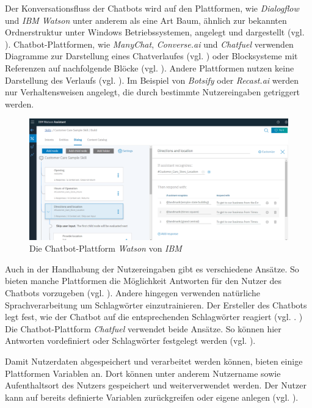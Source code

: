 Der Konversationsfluss der Chatbots wird auf den Plattformen, wie \emph{Dialogflow} und \emph{IBM Watson} unter anderem als eine Art Baum, ähnlich zur bekannten Ordnerstruktur unter Windows Betriebssystemen, angelegt und dargestellt (vgl. \cite{Dialogfl40:online} \cite{KatalogI56:online}). Chatbot-Plattformen, wie \emph{ManyChat}, \emph{Converse.ai} und \emph{Chatfuel} verwenden Diagramme zur Darstellung eines Chatverlaufes (vgl. \cite{Converse15:online} \cite{WelcomeM66:online}) oder Blocksysteme mit Referenzen auf nachfolgende Blöcke (vgl. \cite{Chatfuel3:online}). Andere Plattformen nutzen keine Darstellung des Verlaufs (vgl. \cite{BotsifyC64:online}). Im Beispiel von \emph{Botsify} oder \emph{Recast.ai} werden nur Verhaltensweisen angelegt, die durch bestimmte Nutzereingaben getriggert werden. 

\begin{figure}[h]
\centering
\includegraphics[width=1\textwidth]{pictures/watson}
\caption{Die Chatbot-Plattform \emph{Watson} von \emph{IBM}}
\label{watson}
\end{figure}

Auch in der Handhabung der Nutzereingaben gibt es verschiedene Ansätze. So bieten manche Plattformen die Möglichkeit Antworten für den Nutzer des Chatbots vorzugeben (vgl. \cite{Chatfuel3:online} \cite{WelcomeM66:online}). Andere hingegen verwenden natürliche Sprachverarbeitung um Schlagwörter einzutrainieren. Der Ersteller des Chatbots legt fest, wie der Chatbot auf die entsprechenden Schlagwörter reagiert (vgl. \cite{BotsifyC64:online}. \cite{Dialogfl40:online} \cite{KatalogI56:online}) Die Chatbot-Plattform \emph{Chatfuel} verwendet beide Ansätze. So können hier Antworten vordefiniert oder Schlagwörter festgelegt werden (vgl. \cite{Chatfuel3:online}). 

Damit Nutzerdaten abgespeichert und verarbeitet werden können, bieten einige Plattformen Variablen an. Dort können unter anderem Nutzername sowie Aufenthaltsort des Nutzers gespeichert und weiterverwendet werden. Der Nutzer kann auf bereits definierte Variablen zurückgreifen oder eigene anlegen (vgl. \cite{Chatfuel3:online} \cite{Converse15:online} \cite{Dialogfl40:online} \cite{KatalogI56:online} \cite{WelcomeM66:online}). 



